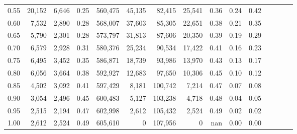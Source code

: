 \begin{tabular}{rrrcrrrrrrrrrrr}
0.55 &   20,152 &   6,646 &                                       0.25 &  560,475 &   45,135 &   82,415 &   25,541 &  0.36 &  0.24 &                         0.42 \\
0.60 &    7,532 &   2,890 &                                       0.28 &  568,007 &   37,603 &   85,305 &   22,651 &  0.38 &  0.21 &                         0.35 \\
0.65 &    5,790 &   2,301 &                                       0.28 &  573,797 &   31,813 &   87,606 &   20,350 &  0.39 &  0.19 &                         0.29 \\
0.70 &    6,579 &   2,928 &                                       0.31 &  580,376 &   25,234 &   90,534 &   17,422 &  0.41 &  0.16 &                         0.23 \\
0.75 &    6,495 &   3,452 &                                       0.35 &  586,871 &   18,739 &   93,986 &   13,970 &  0.43 &  0.13 &                         0.17 \\
0.80 &    6,056 &   3,664 &                                       0.38 &  592,927 &   12,683 &   97,650 &   10,306 &  0.45 &  0.10 &                         0.12 \\
0.85 &    4,502 &   3,092 &                                       0.41 &  597,429 &    8,181 &  100,742 &    7,214 &  0.47 &  0.07 &                         0.08 \\
0.90 &    3,054 &   2,496 &                                       0.45 &  600,483 &    5,127 &  103,238 &    4,718 &  0.48 &  0.04 &                         0.05 \\
0.95 &    2,515 &   2,194 &                                       0.47 &  602,998 &    2,612 &  105,432 &    2,524 &  0.49 &  0.02 &                         0.02 \\
1.00 &    2,612 &   2,524 &                                       0.49 &  605,610 &        0 &  107,956 &        0 &   nan &  0.00 &                         0.00 \\
\bottomrule
\end{tabular}
